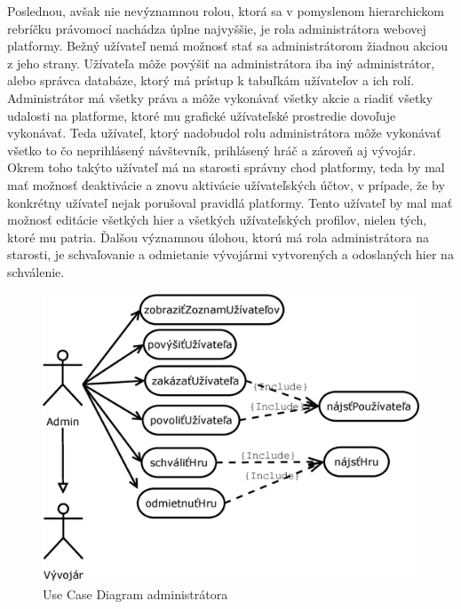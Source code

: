 Poslednou, avšak nie nevýznamnou rolou, ktorá sa v pomyslenom hierarchickom rebríčku právomocí nachádza úplne najvyššie, je rola administrátora webovej platformy. Bežný užívateľ nemá možnosť stať sa administrátorom žiadnou akciou z jeho strany. Užívateľa môže povýšiť na administrátora iba iný administrátor, alebo správca databáze, ktorý má prístup k tabuľkám užívateľov a ich rolí. Administrátor má všetky práva a môže vykonávať všetky akcie a riadiť všetky udalosti na platforme, ktoré mu grafické užívateľské prostredie dovoľuje vykonávať. Teda užívateľ, ktorý nadobudol rolu administrátora môže vykonávať všetko to čo neprihlásený návštevník, prihlásený hráč a zároveň aj vývojár. Okrem toho takýto užívateľ má na starosti správny chod platformy, teda by mal mať možnosť deaktivácie a znovu aktivácie užívateľských účtov, v prípade, že by konkrétny užívateľ nejak porušoval pravidlá platformy. Tento užívateľ by mal mať možnosť editácie všetkých hier a všetkých užívateľských profilov, nielen tých, ktoré mu patria. Ďalšou významnou úlohou, ktorú má rola administrátora na starosti, je schvaľovanie a odmietanie vývojármi vytvorených a odoslaných hier na schválenie.
\begin{figure}[h]
  \centering
  \includegraphics[scale=0.40]{fig/ucd-admin.eps}
  \caption{Use Case Diagram administrátora}
  \label{fig:ucdadmin}
\end{figure}

